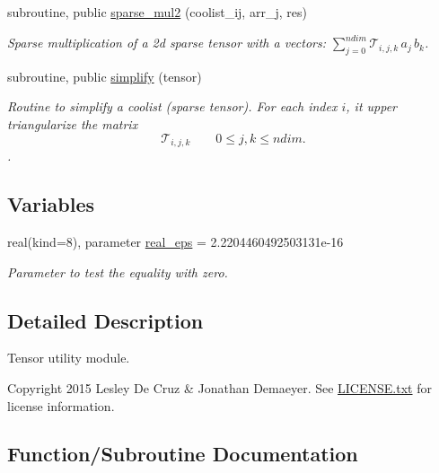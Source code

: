 \begin{DoxyCompactItemize}
subroutine, public \hyperlink{namespacetensor_a70230d57c615d9548905bc023f5fc01d}{sparse\+\_\+mul2} (coolist\+\_\+ij, arr\+\_\+j, res)
\begin{DoxyCompactList}\small\item\em Sparse multiplication of a 2d sparse tensor with a vectors\+: ${\displaystyle \sum_{j=0}^{ndim}} \mathcal{T}_{i,j,k} \, a_j \,b_k$. \end{DoxyCompactList}\item 
subroutine, public \hyperlink{namespacetensor_a364522b80ab0f4785c331eb74fa1ba04}{simplify} (tensor)
\begin{DoxyCompactList}\small\item\em Routine to simplify a coolist (sparse tensor). For each index $i$, it upper triangularize the matrix \[\mathcal{T}_{i,j,k} \qquad 0 \leq j,k \leq ndim.\]. \end{DoxyCompactList}\end{DoxyCompactItemize}
\subsection*{Variables}
\begin{DoxyCompactItemize}
\item 
real(kind=8), parameter \hyperlink{namespacetensor_a2a2ab182d86107e62533c3f0043652cc}{real\+\_\+eps} = 2.\+2204460492503131e-\/16
\begin{DoxyCompactList}\small\item\em Parameter to test the equality with zero. \end{DoxyCompactList}\end{DoxyCompactItemize}


\subsection{Detailed Description}
Tensor utility module. 

\begin{DoxyCopyright}{Copyright}
2015 Lesley De Cruz \& Jonathan Demaeyer. See \hyperlink{LICENSE_8txt}{L\+I\+C\+E\+N\+S\+E.\+txt} for license information. 
\end{DoxyCopyright}


\subsection{Function/\+Subroutine Documentation}
